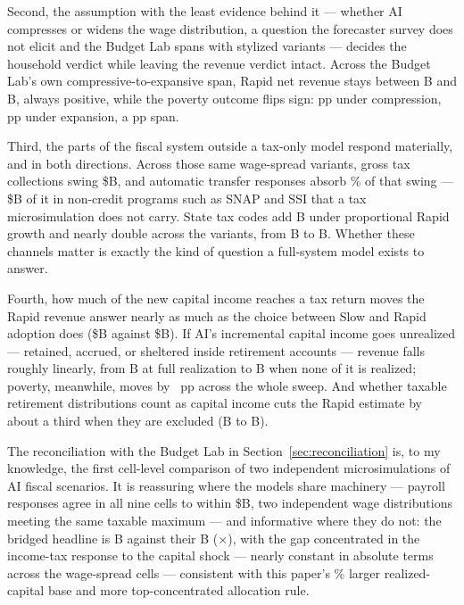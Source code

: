 Second, the assumption with the least evidence behind it --- whether AI
compresses or widens the wage distribution, a question the forecaster survey
does not elicit and the Budget Lab spans with stylized variants --- decides
the household verdict while leaving the revenue verdict intact. Across the Budget Lab's own
compressive-to-expansive span, Rapid net revenue stays between
\genRapidCompRev B and \genRapidExpRev B, always positive, while the poverty
outcome flips sign: \genRapidCompPovPp pp under compression,
\genRapidExpPovPp pp under expansion, a \genRapidPovSpanPp pp span.

Third, the parts of the fiscal system outside a tax-only model respond
materially, and in both directions. Across those same wage-spread variants,
gross tax collections swing \$\genGrossTaxSwing B, and automatic transfer
responses absorb \genTransferAbsorbPct\% of that swing ---
\$\genBenefitSwing B of it in non-credit programs such as SNAP and SSI that a
tax microsimulation does not carry. State tax codes add
\genRapidPropState B under proportional Rapid growth and nearly double across
the variants, from \genRapidCompState B to \genRapidExpState B. Whether these
channels matter is exactly the kind of question a full-system model exists to
answer.

Fourth, how much of the new capital income reaches a tax return moves the
Rapid revenue answer nearly as much as the choice between Slow and Rapid
adoption does (\$\genRealFullLessZeroB B against \$\genScenarioSpanB B). If AI's incremental
capital income goes unrealized --- retained, accrued, or sheltered inside
retirement accounts --- revenue falls roughly linearly, from
\genRealFullRev B at full realization to \genRealZeroRev B when none of it
is realized; poverty, meanwhile, moves by \genRealPovSpanPp~pp across the
whole sweep. And whether
taxable retirement distributions count as capital income cuts the Rapid
estimate by about a third when they are excluded (\genRapidScopeFull B to
\genRapidScopeExcl B).

The reconciliation with the Budget Lab in Section~\ref{sec:reconciliation} is,
to my knowledge, the first cell-level comparison of two independent
microsimulations of AI fiscal scenarios. It is reassuring where the models
share machinery --- payroll responses agree in all nine cells to within
\$\genPayrollMaxCellGap B, two independent wage distributions meeting the
same taxable maximum --- and
informative where they do not: the bridged headline is \genBridgeOursTotal B
against their \genBridgeTheirsTotal B (\genBridgeRatio$\times$), with the gap
concentrated in the income-tax response to the capital shock --- nearly
constant in absolute terms across the wage-spread cells --- consistent with
this paper's \genBaseGapPct\% larger realized-capital base and more
top-concentrated allocation rule.

